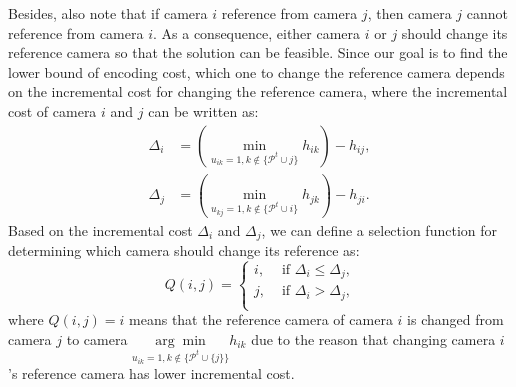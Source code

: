 Besides, also note that if camera $i$ reference from camera $j$, then camera $j$ cannot reference from camera $i$.
As a consequence, either camera $i$ or $j$ should change its reference camera so that the solution can be feasible.
Since our goal is to find the lower bound of encoding cost, which one to change the reference camera depends on the incremental cost for changing the reference camera, where the incremental cost of camera $i$ and $j$ can be written as:
\begin{align}
\Delta_i &= \left( \underset{u_{ik}=1, k \notin \{\mathcal{P}^t \cup j\}}{\min} h_{ik} \right) - h_{ij}, \nonumber \\
\Delta_j &= \left( \underset{u_{kj}=1, k \notin \{\mathcal{P}^t \cup i\}}{\min} h_{jk} \right) - h_{ji}.
\end{align}
Based on the incremental cost $\Delta_i$ and $\Delta_j$, we can define a selection function for determining which camera should change its reference as:
\begin{equation}
Q(i,j) = 
\left\{ \begin{array}{ll}
i,  &\text{ if $\Delta_i \leq \Delta_j$,} \\                  	   
j,  &\text{ if $\Delta_i > \Delta_j$,} \\
\end{array} \right.
\label{eq::selectionFunctionQ}
\end{equation}
where $Q(i,j) = i$ means that the reference camera of camera $i$ is changed from camera $j$ to camera $\underset{u_{ik}=1, k \notin \{\mathcal{P}^t \cup\{j\}\}}{\arg \min} h_{ik}$ due to the reason that changing camera $i$'s reference camera has lower incremental cost.

